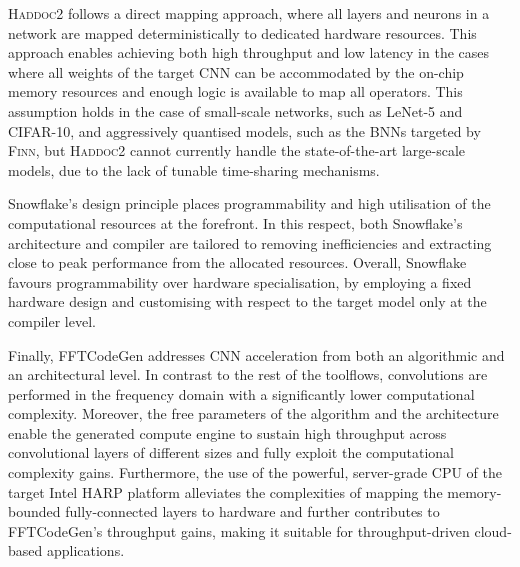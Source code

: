 \documentclass[format=acmsmall, review=false, screen=true]{acmart}
\begin{document}
{\color{black}\textsc{Haddoc2} follows a direct mapping approach, where all layers and neurons in a network are mapped deterministically to dedicated hardware resources. This approach enables achieving both high throughput and low latency in the cases where all weights of the target CNN can be accommodated by the on-chip memory resources and enough logic is available to map all operators. This assumption holds in the case of small-scale networks, such as LeNet-5 and CIFAR-10, and aggressively quantised models, such as the BNNs targeted by \textsc{Finn}, but \textsc{Haddoc2} cannot currently handle the state-of-the-art large-scale models, due to the lack of tunable time-sharing mechanisms.}

{\color{black}Snowflake's design principle places programmability and high utilisation of the computational resources at the forefront. In this respect, both Snowflake's architecture and compiler are tailored to removing inefficiencies and extracting close to peak performance from the allocated resources. Overall, Snowflake favours programmability over hardware specialisation, by employing a fixed hardware design and customising with respect to the target model only at the compiler level.}

{\color{black}Finally, FFTCodeGen addresses CNN acceleration from both an algorithmic and an architectural level. In contrast to the rest of the toolflows, convolutions are performed in the frequency domain with a significantly lower computational complexity. Moreover, the free parameters of the algorithm and the architecture enable the generated compute engine to sustain high throughput across convolutional layers of different sizes and fully exploit the computational complexity gains. Furthermore, the use of the powerful, server-grade CPU of the target Intel HARP platform alleviates the complexities of mapping the memory-bounded fully-connected layers to hardware and further contributes to FFTCodeGen's throughput gains, making it suitable for throughput-driven cloud-based applications.}
\end{document}
